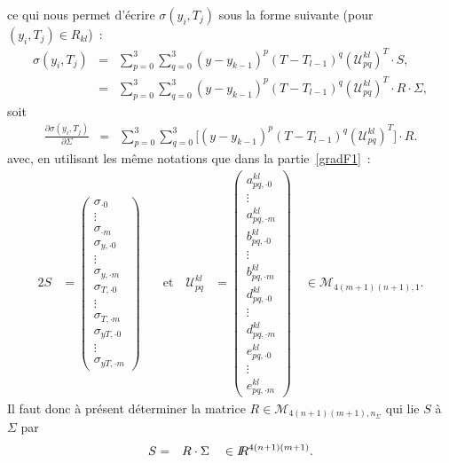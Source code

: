 ce qui nous permet d'\'ecrire $\sigma(y_i,T_j)$ sous la forme 
suivante (pour $(y_i,T_j)\in R_{kl}$)~:
\begin{eqnarray*}
\sigma(y_i,T_j) &=& \sum_{p=0}^3\sum_{q=0}^3 
(y-y_{k-1})^p(T-T_{l-1})^q (\mathcal{U}_{pq}^{kl})^T \cdot S,\\
&=& \sum_{p=0}^3\sum_{q=0}^3 (y-y_{k-1})^p(T-T_{l-1})^q 
(\mathcal{U}_{pq}^{kl})^T \cdot R \cdot \Sigma,
\end{eqnarray*}
soit
\begin{eqnarray}
\frac{\partial \sigma(y_i,T_j)}{\partial \Sigma} &=& 
\sum_{p=0}^3\sum_{q=0}^3 \biggl[(y-y_{k-1})^p(T-T_{l-1})^q 
(\mathcal{U}_{pq}^{kl})^T \biggr]\cdot R. \label{deriv_sigmaij_Sigma}
\end{eqnarray}
avec, en utilisant les m\^eme notations que dans la 
partie~\ref{gradF1}~:
\begin{alignat*}{2}
S &= 
\begin{pmatrix}
\sigma_{\cdot 0}\\\vdots\\\sigma_{\cdot m}\\ 
\sigma_{y,\cdot 0}\\\vdots\\\sigma_{y,\cdot m}\\ 
\sigma_{T,\cdot 0}\\\vdots\\\sigma_{T,\cdot m}\\ 
\sigma_{yT,\cdot 0}\\\vdots\\\sigma_{yT,\cdot m}
\end{pmatrix} 
&\quad \text{et}\quad \mathcal{U}_{pq}^{kl} &= 
\begin{pmatrix}
a_{pq,\cdot 0}^{kl}\\\vdots\\a_{pq,\cdot m}^{kl} \\
b_{pq,\cdot 0}^{kl}\\ \vdots\\ b_{pq,\cdot m}^{kl}\\ 
d_{pq,\cdot 0}^{kl}\\ \vdots\\d_{pq,\cdot m}^{kl} \\ 
e_{pq,\cdot 0}^{kl}\\ \vdots\\ e_{pq,\cdot m}^{kl} 
\end{pmatrix} 
\quad \in \mathcal{M}_{4(m+1)(n+1),1}. 
\end{alignat*}
Il faut donc \`a pr\'esent d\'eterminer la matrice 
$R \in \mathcal{M}_{4(n+1)(m+1),n_{\Sigma}}$ qui lie $S$ \`a 
$\Sigma$ par 
\begin{eqnarray*}
S &=& R\cdot\Sigma \quad \in I\!\! R^{4(n+1)(m+1)}.
\end{eqnarray*} 

